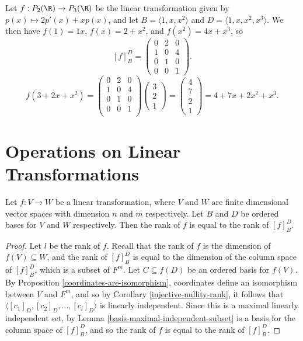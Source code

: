 \documentclass[12pt]{article}
\begin{document}
\begin{exmp}
    Let $f: P_2(\R) \to P_3(\R)$ be the linear transformation given by $p(x) \mapsto 2p'(x) + xp(x)$, and let $B = \langle 1, x, x^2\rangle$ and $D = \langle 1, x, x^2, x^3\rangle$. We then have $f(1) = 1x$, $f(x) = 2 + x^2$, and $f(x^2) = 4x + x^3$, so
    \[[f]_B^D = \begin{pmatrix}
        0 & 2 & 0 \\ 1 & 0 & 4 \\ 0 & 1 & 0 \\ 0 & 0 & 1
    \end{pmatrix}.\]
    \[f(3 + 2x + x^2) = \begin{pmatrix}
        0 & 2 & 0\\
        1 & 0 & 4\\
        0 & 1 & 0\\
        0 & 0 & 1\\
    \end{pmatrix}\begin{pmatrix}
        3 \\ 2 \\ 1
    \end{pmatrix} = \begin{pmatrix}
        4 \\ 7 \\ 2 \\ 1
    \end{pmatrix} = 4 + 7x + 2x^2 + x^3.\]
\end{exmp}

\section{Operations on Linear Transformations}

\begin{thm}
    Let $f: V \to W$ be a linear transformation, where $V$ and $W$ are finite dimensional vector spaces with dimension $n$ and $m$ respectively. Let $B$ and $D$ be ordered bases for $V$ and $W$ respectively. Then the rank of $f$ is equal to the rank of $[f]_B^D$.
\end{thm}

\begin{proof}
    Let $l$ be the rank of $f$. Recall that the rank of $f$ is the dimension of $f(V) \subseteq W$, and the rank of $[f]_B^D$ is equal to the dimension of the column space of $[f]_B^D$, which is a subset of $F^m$. Let $C \subseteq f(D)$ be an ordered basis for $f(V)$. By Proposition \ref{coordinates-are-isomorphism}, coordinates define an isomorphism between $V$ and $F^m$, and so by Corollary \ref{injective-nullity-rank}, it follows that $\langle [c_1]_D, [c_2]_D, \ldots, [c_l]_D\rangle$ is linearly independent. Since this is a maximal linearly independent set, by Lemma \ref{basis-maximal-independent-subset} is a basis for the column space of $[f]_B^D$, and so the rank of $f$ is equal to the rank of $[f]_B^D$.
\end{proof}
\end{document}
